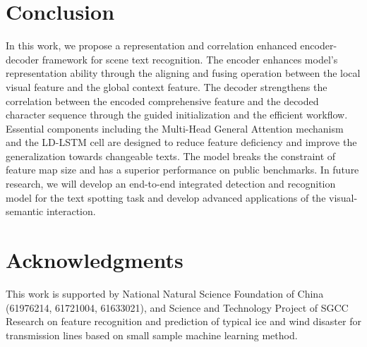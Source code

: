 \documentclass[runningheads]{llncs}
\begin{document}
\section{Conclusion}
In this work, we propose a representation and correlation enhanced encoder-decoder framework for scene text recognition. The encoder enhances model's representation ability through the aligning and fusing operation between the local visual feature and the global context feature. The decoder strengthens the correlation between the encoded comprehensive feature and the decoded character sequence through the guided initialization and the efficient workflow. Essential components including the Multi-Head General Attention mechanism and the LD-LSTM cell are designed to reduce feature deficiency and improve the generalization towards changeable texts. The model breaks the constraint of feature map size and has a superior performance on public benchmarks. In future research, we will develop an end-to-end integrated detection and recognition model for the text spotting task and develop advanced applications of the visual-semantic interaction.

\section{Acknowledgments}
This work is supported by National Natural Science Foundation of China (61976214, 61721004, 61633021), and Science and Technology Project of SGCC Research on feature recognition and prediction of typical ice and wind disaster for transmission lines based on small sample machine learning method.
\vspace{1cm}




\end{document}
